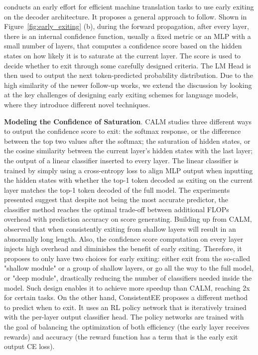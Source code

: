 \cite{elbayad2020depthadaptive} conducts an early effort for efficient machine translation tasks to use early exiting on the decoder architecture. 
It proposes a general approach to follow. 
Shown in Figure~\ref{fig:early_exiting} (b), during the forward propagation, after every layer, there is an internal confidence function, usually a fixed metric or an MLP with a small number of layers, that computes a confidence score based on the hidden states on how likely it is to saturate at the current layer. The score is used to decide whether to exit through some carefully designed criteria. 
The LM Head is then used to output the next token-predicted probability distribution. 
Due to the high similarity of the newer follow-up works, we extend the discussion by looking at the key challenges of designing early exiting schemes for language models, where they introduce different novel techniques. 

\textbf{Modeling the Confidence of Saturation}. CALM \citep{schuster2022confident} studies three different ways to output the confidence score to exit: the softmax response, or the difference between the top two values after the softmax; the saturation of hidden states, or the cosine similarity between the current layer's hidden states with the last layer; the output of a linear classifier inserted to every layer. 
The linear classifier is trained by simply using a cross-entropy loss to align MLP output when inputting the hidden states with whether the top-1 token decoded as exiting on the current layer matches the top-1 token decoded of the full model. 
The experiments presented suggest that despite not being the most accurate predictor, the classifier method reaches the optimal trade-off between additional FLOPs overhead with prediction accuracy on score generating. 
Building up from CALM, \citep{bae2023fast} observed that when consistently exiting from shallow layers will result in an abnormally long length. Also, the confidence score computation on every layer injects high overhead and diminishes the benefit of early exiting. Therefore, it proposes to only have two choices for early exiting: either exit from the so-called "shallow module" or a group of shallow layers, or go all the way to the full model, or "deep module", drastically reducing the number of classifiers needed inside the model. Such design enables it to achieve more speedup than CALM, reaching 2x for certain tasks. 
On the other hand, ConsistentEE \citet{zeng2023consistentee} proposes a different method to predict when to exit. It uses an RL policy network that is iteratively trained with the per-layer output classifier head. The policy networks are trained with the goal of balancing the optimization of both efficiency (the early layer receives rewards) and accuracy (the reward function has a term that is the early exit output CE loss). 

